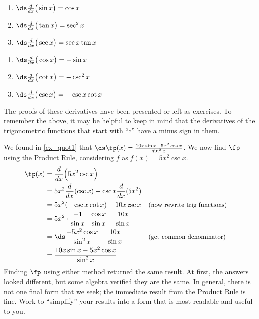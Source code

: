 {\noindent\begin{minipage}[t]{.5\specialboxlength}
	\begin{enumerate}
		\item	$\ds \frac{d}{dx}\big(\sin x\big) = \cos x$\addtocounter{enumi}{1}
		\item	$\ds \frac{d}{dx}\big(\tan x\big) = \sec^2 x$\addtocounter{enumi}{1}
		\item	$\ds \frac{d}{dx}\big(\sec x\big) = \sec x\tan x$\addtocounter{enumi}{1}
	\end{enumerate}
\end{minipage}%
\begin{minipage}[t]{.5\specialboxlength}
	\begin{enumerate}\addtocounter{enumi}{1}
		\item	$\ds \frac{d}{dx}\big(\cos x\big) = -\sin x$\addtocounter{enumi}{1}
		\item	$\ds \frac{d}{dx}\big(\cot x\big) = -\csc^2 x$\addtocounter{enumi}{1}
		\item	$\ds \frac{d}{dx}\big(\csc x\big) = -\csc x\cot x$
	\end{enumerate}
\end{minipage}}

The proofs of these derivatives have been presented or left as exercises. To remember the above, it may be helpful to keep in mind that the derivatives of the trigonometric functions that start with ``c'' have a minus sign in them.

{We found in \autoref{ex_quot1} that $\ds \fp(x) = \frac{10x\sin x - 5x^2\cos x}{\sin^2 x}$. We now find $\fp$ using the Product Rule, considering $f$ as $f(x) = 5x^2\csc x$.
\begin{align*}
	\fp(x)
	&= \frac{d}{dx}\Big(5x^2\csc x\Big) \\
	& = 5x^2 \frac{d}{dx} (\csc x) - \csc x \frac{d}{dx}(5x^2) \\
	&= 5x^2(-\csc x\cot x) + 10x\csc x && \text{\small (now rewrite trig functions)}\\
	&= 5x^2\cdot \frac{-1}{\sin x}\cdot \frac{\cos x}{\sin x} + \frac{10x}{\sin x}\\
	&= \ds\frac{-5x^2\cos x}{\sin ^2x}+\frac{10x}{\sin x} && \text{\small (get common denominator)}\\
	&= \frac{10x\sin x - 5x^2\cos x}{\sin^2x}
\end{align*}
Finding $\fp$ using either method returned the same result. At first, the answers looked different, but some algebra verified they are the same. In general, there is not one final form that we seek; the immediate result from the Product Rule is fine. Work to ``simplify\primeskip'' your results into a form that is most readable and useful to you.}

